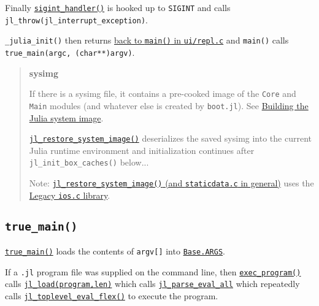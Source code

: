 Finally \href{https://github.com/JuliaLang/julia/blob/master/src/signals-unix.c}{\texttt{sigint\_handler()}} is hooked up to \texttt{SIGINT} and calls \texttt{jl\_throw(jl\_interrupt\_exception)}.



\texttt{\_julia\_init()} then returns \href{https://github.com/JuliaLang/julia/blob/master/ui/repl.c}{back to \texttt{main()} in \texttt{ui/repl.c}} and \texttt{main()} calls \texttt{true\_main(argc, (char**)argv)}.



\begin{quote}
\textbf{sysimg}

If there is a sysimg file, it contains a pre-cooked image of the \texttt{Core} and \texttt{Main} modules (and whatever else is created by \texttt{boot.jl}). See \hyperlink{15513456349900674098}{Building the Julia system image}.

\href{https://github.com/JuliaLang/julia/blob/master/src/staticdata.c}{\texttt{jl\_restore\_system\_image()}} deserializes the saved sysimg into the current Julia runtime environment and initialization continues after \texttt{jl\_init\_box\_caches()} below...

Note: \href{https://github.com/JuliaLang/julia/blob/master/src/staticdata.c}{\texttt{jl\_restore\_system\_image()} (and \texttt{staticdata.c} in general)} uses the \hyperlink{3841537160196121279}{Legacy \texttt{ios.c} library}.

\end{quote}


\hypertarget{8052465870854670365}{}


\subsection{\texttt{true\_main()}}



\href{https://github.com/JuliaLang/julia/blob/master/ui/repl.c}{\texttt{true\_main()}} loads the contents of \texttt{argv[]} into \hyperlink{2567473177880607455}{\texttt{Base.ARGS}}.



If a \texttt{.jl} {\textquotedbl}program{\textquotedbl} file was supplied on the command line, then \href{https://github.com/JuliaLang/julia/blob/master/ui/repl.c}{\texttt{exec\_program()}} calls \href{https://github.com/JuliaLang/julia/blob/master/src/toplevel.c}{\texttt{jl\_load(program,len)}} which calls \href{https://github.com/JuliaLang/julia/blob/master/src/ast.c}{\texttt{jl\_parse\_eval\_all}} which repeatedly calls \href{https://github.com/JuliaLang/julia/blob/master/src/toplevel.c}{\texttt{jl\_toplevel\_eval\_flex()}} to execute the program.



